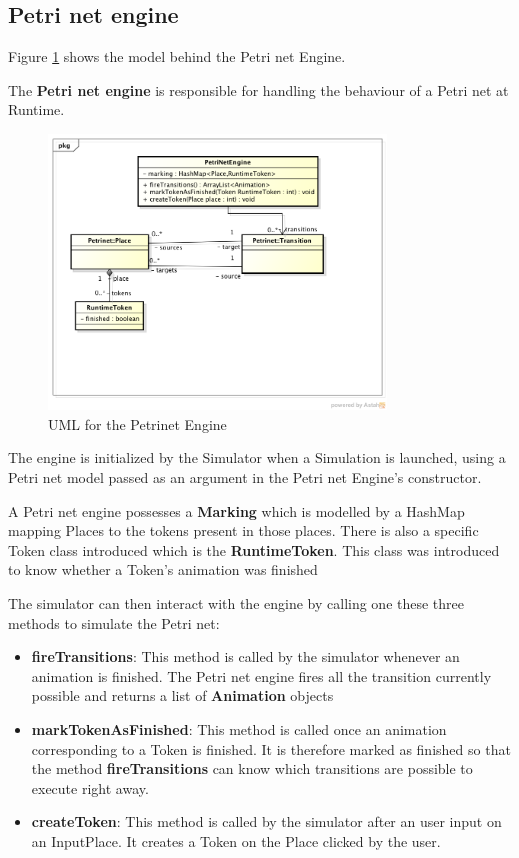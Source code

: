 \subsection{Petri net engine}

Figure \ref{fig:uml-petrinet-engine} shows the model behind the Petri net Engine.

The \textbf{Petri net engine} is responsible for handling the behaviour of a Petri net at Runtime. 
 
\begin{figure}[htp]
\begin{center}
  \includegraphics[width=0.8\textwidth]{image/petrinet_engine.png}
  \caption{UML for the Petrinet Engine}
  \label{fig:uml-petrinet-engine}
\end{center}
\end{figure}

The engine is initialized by the Simulator when a Simulation is launched, using a Petri net model passed as an argument in the Petri net Engine's constructor.

A Petri net engine possesses a \textbf{Marking} which is modelled by a HashMap mapping Places to the tokens present in those places.
There is also a specific Token class introduced which is the \textbf{RuntimeToken}. This class was introduced to know whether a Token's animation was finished 

The simulator can then interact with the engine by calling one these three methods to simulate the Petri net:

\begin{itemize}
  \item \textbf{fireTransitions}: This method is called by the simulator whenever an animation is finished. The Petri net engine fires all the transition currently possible and returns a list of \textbf{Animation} objects
  \item \textbf{markTokenAsFinished}: This method is called once an animation corresponding to a Token is finished. It is therefore marked as finished so that the method \textbf{fireTransitions} can know which transitions are possible to execute right away.
  \item \textbf{createToken}: This method is called by the simulator after an user input on an InputPlace. It creates a Token on the Place clicked by the user.
\end{itemize}
 

